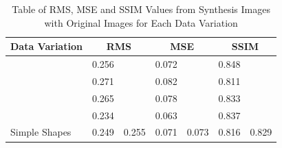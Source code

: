 \documentclass[conference]{IEEEtran}
\begin{document}
\begin{table}[]
  \caption{Table of RMS, MSE and SSIM Values from Synthesis Images with Original Images for Each Data Variation}
  \label{tb:evaluasimatriks}
  \begin{tabular}{|l|cc|cc|cc|}
  \hline
  \multicolumn{1}{|c|}{Data Variation}                  & \multicolumn{2}{c|}{RMS}                                                                               & \multicolumn{2}{c|}{MSE}                                                                                   & \multicolumn{2}{c|}{SSIM}                                                                            \\ \hline
                                                      & \multicolumn{1}{c|}{\cellcolor[HTML]{FFFFFF}0.256} & \cellcolor[HTML]{FFFFFF}                         & \multicolumn{1}{c|}{\cellcolor[HTML]{FFFFFF}0.072}  & \cellcolor[HTML]{FFFFFF}                           & \multicolumn{1}{c|}{\cellcolor[HTML]{FFFFFF}0.848} & \cellcolor[HTML]{FFFFFF}                        \\ \cline{2-2} \cline{4-4} \cline{6-6}
                                                      & \multicolumn{1}{c|}{\cellcolor[HTML]{FFFFFF}0.271} & \cellcolor[HTML]{FFFFFF}                         & \multicolumn{1}{c|}{\cellcolor[HTML]{FFFFFF}0.082}  & \cellcolor[HTML]{FFFFFF}                           & \multicolumn{1}{c|}{\cellcolor[HTML]{FFFFFF}0.811} & \cellcolor[HTML]{FFFFFF}                        \\ \cline{2-2} \cline{4-4} \cline{6-6}
                                                      & \multicolumn{1}{c|}{\cellcolor[HTML]{FFFFFF}0.265} & \cellcolor[HTML]{FFFFFF}                         & \multicolumn{1}{c|}{\cellcolor[HTML]{FFFFFF}0.078}  & \cellcolor[HTML]{FFFFFF}                           & \multicolumn{1}{c|}{\cellcolor[HTML]{FFFFFF}0.833} & \cellcolor[HTML]{FFFFFF}                        \\ \cline{2-2} \cline{4-4} \cline{6-6}
                                                      & \multicolumn{1}{c|}{\cellcolor[HTML]{FFFFFF}0.234} & \cellcolor[HTML]{FFFFFF}                         & \multicolumn{1}{c|}{\cellcolor[HTML]{FFFFFF}0.063}  & \cellcolor[HTML]{FFFFFF}                           & \multicolumn{1}{c|}{\cellcolor[HTML]{FFFFFF}0.837} & \cellcolor[HTML]{FFFFFF}                        \\ \cline{2-2} \cline{4-4} \cline{6-6}
  \multirow{-5}{*}{Simple Shapes}          & \multicolumn{1}{c|}{\cellcolor[HTML]{FFFFFF}0.249} & \multirow{-5}{*}{\cellcolor[HTML]{FFFFFF}0.255}  & \multicolumn{1}{c|}{\cellcolor[HTML]{FFFFFF}0.071}  & \multirow{-5}{*}{\cellcolor[HTML]{FFFFFF}0.073}       & \multicolumn{1}{c|}{\cellcolor[HTML]{FFFFFF}0.816} & \multirow{-5}{*}{\cellcolor[HTML]{FFFFFF}0.829} \\ \hline

\end{tabular}
\end{table}
\end{document}
